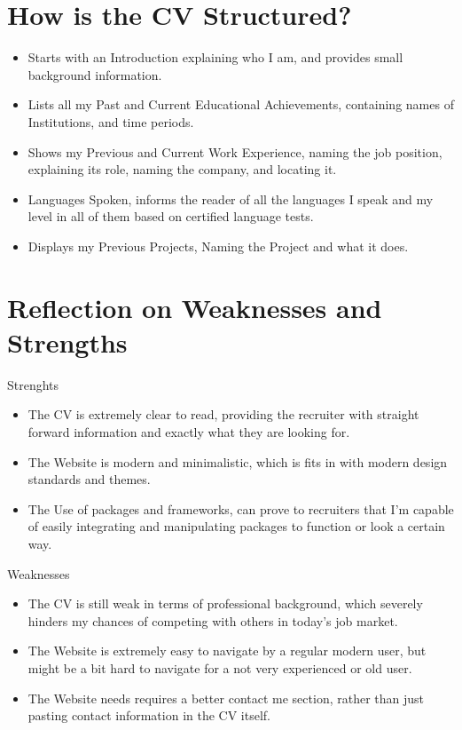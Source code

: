 \documentclass[12pt, letterpaper]{article}
\begin{document}
    \section{How is the CV Structured?}
    \begin{itemize}
        \item Starts with an Introduction explaining who I am, and provides small background information.
        \item Lists all my Past and Current Educational Achievements, containing names of Institutions, and time periods.
        \item Shows my Previous and Current Work Experience, naming the job position, explaining its role, naming the company, and locating it.
        \item Languages Spoken, informs the reader of all the languages I speak and my level in all of them based on certified language tests.
        \item Displays my Previous Projects, Naming the Project and what it does.
    \end{itemize}
    \section{Reflection on Weaknesses and Strengths}
    Strenghts
    \begin{itemize}
        \item The CV is extremely clear to read, providing the recruiter with straight forward information and exactly what they are looking for.
        \item The Website is modern and minimalistic, which is fits in with modern design standards and themes.
        \item The Use of packages and frameworks, can prove to recruiters that I'm capable of easily integrating and manipulating packages to function or look a certain way.
    \end{itemize}
    Weaknesses
    \begin{itemize}
        \item The CV is still weak in terms of professional background, which severely hinders my chances of competing with others in today's job market.
        \item The Website is extremely easy to navigate by a regular modern user, but might be a bit hard to navigate for a not very experienced or old user.
        \item The Website needs requires a better contact me section, rather than just pasting contact information in the CV itself.
    \end{itemize}
\end{document}
